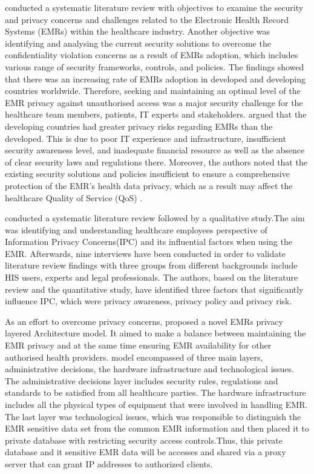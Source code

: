 \citet{Mahfuth2016} conducted a systematic literature review with objectives to examine the security and privacy concerns and challenges related to the Electronic Health Record Systems (EMRs) within the healthcare industry. Another objective was identifying and analysing the current security solutions to overcome the confidentiality violation concerns as a result of  EMRs adoption, which includes various range of security frameworks, controls, and policies. The findings showed that there was an increasing rate of EMRs adoption in developed and developing countries worldwide. Therefore, seeking and maintaining an optimal level of the EMR privacy against unauthorised access was a major security challenge for the healthcare team members, patients, IT experts and stakeholders. \citet{Mahfuth2016} argued that the developing countries had greater privacy risks regarding EMRs than the developed. This is due to poor IT experience and  infrastructure, insufficient security awareness level, and inadequate financial resource as well as the absence of clear security laws and regulations there. Moreover, the authors noted that the existing security solutions and policies  insufficient to ensure a comprehensive protection of the EMR's health data privacy, which as a result may affect the healthcare Quality of Service (QoS) \cite{Mahfuth2016}.

\citet{Rahim2016} conducted a systematic literature review followed by a qualitative study.The aim was identifying and understanding healthcare employees perspective of Information Privacy Concerns(IPC) and its influential factors when using the EMR. Afterwards, nine interviews have been conducted in order to validate literature review findings with three groups from different backgrounds include HIS users, experts and legal professionals. The authors, based on the literature review and the quantitative study,  have identified three factors that significantly influence IPC, which were privacy awareness, privacy policy and privacy risk. 

As an effort to overcome privacy concerns, \citet{Bensefia2014} proposed a novel EMRs privacy layered Architecture model. It aimed to make a balance between maintaining the EMR privacy and at the same time ensuring EMR availability for other authorised health providers. \citet{Bensefia2014} model encompassed of three main layers, administrative decisions, the hardware infrastructure and technological issues. The administrative decisions layer includes security rules, regulations and standards to be satisfied from all healthcare parties. The hardware infrastructure includes all the physical types of equipment that were involved in handling EMR. The last layer was technological issues, which was responsible to distinguish the EMR sensitive data set from the common EMR information and then placed it to private database with restricting security access controls.Thus, this private database and it sensitive EMR data will be accesses and shared via a proxy server that can grant IP addresses to authorized clients. 

